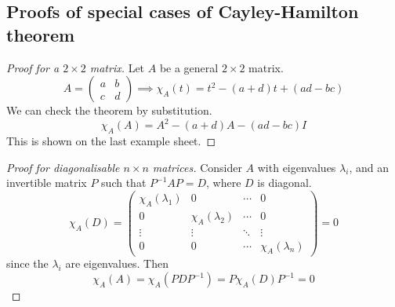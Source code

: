\subsection{Proofs of special cases of Cayley-Hamilton theorem}
\begin{proof}[Proof for a \(2\times 2\) matrix]
	Let \(A\) be a general \(2\times 2\) matrix.
	\[
		A = \begin{pmatrix}
			a & b \\ c & d
		\end{pmatrix} \implies \chi_A(t) = t^2 - (a+d)t + (ad-bc)
	\]
	We can check the theorem by substitution.
	\[
		\chi_A(A) = A^2 - (a+d)A - (ad-bc)I
	\]
	This is shown on the last example sheet.
\end{proof}
\begin{proof}[Proof for diagonalisable \(n \times n\) matrices]
	Consider \(A\) with eigenvalues \(\lambda_i\), and an invertible matrix \(P\) such that \(P^{-1}AP = D\), where \(D\) is diagonal.
	\[
		\chi_A(D) = \begin{pmatrix}
			\chi_A(\lambda_1) & 0                 & \cdots & 0                 \\
			0                 & \chi_A(\lambda_2) & \cdots & 0                 \\
			\vdots            & \vdots            & \ddots & \vdots            \\
			0                 & 0                 & \cdots & \chi_A(\lambda_n)
		\end{pmatrix} = 0
	\]
	since the \(\lambda_i\) are eigenvalues.
	Then
	\[
		\chi_A(A) = \chi_A(PDP^{-1}) = P\chi_A(D)P^{-1} = 0
	\]
\end{proof}

